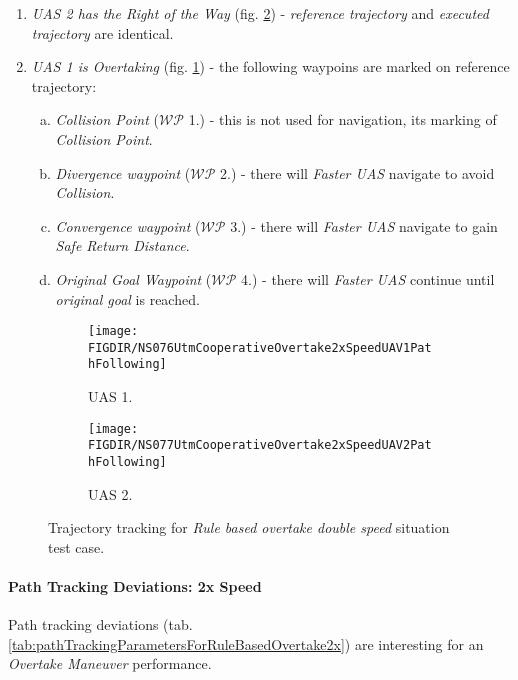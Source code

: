     \begin{enumerate}
        \item \emph{UAS 2 has the Right of the Way} (fig. \ref{fig:ruleBasedOvertake2xPathTrackingUAS2}) - \emph{reference trajectory} and \emph{executed trajectory} are identical. 
        
        \item \emph{UAS 1 is Overtaking} (fig. \ref{fig:ruleBasedOvertake2xdPathTrackingUAS1}) - the following waypoins are marked on reference trajectory:
        \begin{enumerate}[a.]
            \item \emph{Collision Point} ($\mathscr{WP}$ 1.) - this is not used for navigation, its marking of \emph{Collision Point}.
            \item \emph{Divergence waypoint} ($\mathscr{WP}$ 2.) - there will \emph{Faster UAS} navigate to avoid \emph{Collision}.
            \item \emph{Convergence waypoint} ($\mathscr{WP}$ 3.) - there will \emph{Faster UAS} navigate to gain \emph{Safe Return Distance}.
            \item \emph{Original Goal Waypoint} ($\mathscr{WP}$ 4.) - there will \emph{Faster UAS} continue until \emph{original goal} is reached. 
        \end{enumerate}
    \end{enumerate}
    
    \begin{figure}[H]
        \centering
        \begin{subfigure}{0.48\textwidth}
        	\centering
            \texttt{[image: \\FIGDIR/NS076UtmCooperativeOvertake2xSpeedUAV1PathFollowing]}
            \caption{UAS 1.}
            \label{fig:ruleBasedOvertake2xdPathTrackingUAS1}
        \end{subfigure}
        \begin{subfigure}{0.48\textwidth}
        	\centering
            \texttt{[image: \\FIGDIR/NS077UtmCooperativeOvertake2xSpeedUAV2PathFollowing]} 
            \caption{UAS 2.}
            \label{fig:ruleBasedOvertake2xPathTrackingUAS2}
        \end{subfigure}
        \caption{Trajectory tracking for \emph{Rule based overtake double speed} situation test case.}
        \label{fig:testCaseRuleBasedOvertake2xTrajectoryTracking}
    \end{figure}
    
	\newpage
    \paragraph{Path Tracking Deviations: 2x Speed} Path tracking deviations (tab. \ref{tab:pathTrackingParametersForRuleBasedOvertake2x}) are interesting for an \emph{Overtake Maneuver} performance. 
    

